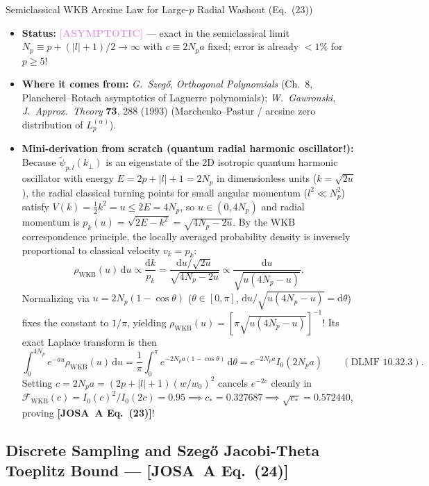 \documentclass[10pt,letterpaper]{article}
\newcommand{\abs}[1]{\lvert #1 \rvert}
\newcommand{\dd}{\mathrm{d}}
\newcommand{\josa}[1]{\textbf{[JOSA~A Eq.~(#1)]}}
\newcommand{\tagasymp}{\textcolor{plum}{\textbf{[ASYMPTOTIC]}}}
\numberwithin{equation}{section}
\begin{document}
\begin{approxbox}{Semiclassical WKB Arcsine Law for Large-$p$ Radial Washout (Eq.~(23))}
\begin{itemize}[leftmargin=1.4em,itemsep=2pt,topsep=1pt]
  \item \textbf{Status:} \tagasymp{} --- exact in the semiclassical limit $N_p \equiv p + (\abs{l}+1)/2 \to \infty$ with $c \equiv 2N_p a$ fixed; error is already $< 1\%$ for $p \ge 5$!
  \item \textbf{Where it comes from:} \emph{G.\ Szeg\H{o}}, \emph{Orthogonal Polynomials} (Ch.~8, Plancherel--Rotach asymptotics of Laguerre polynomials); \emph{W.\ Gawronski}, \emph{J.\ Approx.\ Theory} \textbf{73}, 288 (1993) (Marchenko--Pastur / arcsine zero distribution of $L_p^{(\alpha)}$).
  \item \textbf{Mini-derivation from scratch (quantum radial harmonic oscillator!):} Because $\widetilde{\psi}_{p,l}(k_\perp)$ is an eigenstate of the 2D isotropic quantum harmonic oscillator with energy $E = 2p + \abs{l} + 1 = 2N_p$ in dimensionless units ($k = \sqrt{2u}$), the radial classical turning points for small angular momentum ($l^2 \ll N_p^2$) satisfy $V(k) = \frac{1}{2}k^2 = u \le 2E = 4N_p$, so $u \in (0, 4N_p)$ and radial momentum is $p_k(u) = \sqrt{2E - k^2} = \sqrt{4N_p - 2u}$. By the WKB correspondence principle, the locally averaged probability density is inversely proportional to classical velocity $v_k = p_k$:
  \[
    \rho_{\mathrm{WKB}}(u)\,\dd u \propto \frac{\dd k}{p_k} = \frac{\dd u/\sqrt{2u}}{\sqrt{4N_p - 2u}} \propto \frac{\dd u}{\sqrt{u(4N_p - u)}}.
  \]
  Normalizing via $u = 2N_p(1 - \cos\theta)$ ($\theta \in [0,\pi]$, $\dd u/\sqrt{u(4N_p-u)} = \dd\theta$) fixes the constant to $1/\pi$, yielding $\rho_{\mathrm{WKB}}(u) = [\pi\sqrt{u(4N_p-u)}]^{-1}$! Its exact Laplace transform is then
  \[
    \int_0^{4N_p} e^{-au}\rho_{\mathrm{WKB}}(u)\,\dd u = \frac{1}{\pi}\int_0^\pi e^{-2N_p a(1-\cos\theta)}\,\dd\theta = e^{-2N_p a} I_0(2N_p a) \qquad (\text{DLMF~10.32.3}).
  \]
  Setting $c = 2N_p a = (2p+\abs{l}+1)(w/w_0)^2$ cancels $e^{-2c}$ cleanly in $\mathcal{F}_{\mathrm{WKB}}(c) = I_0(c)^2/I_0(2c) = 0.95 \implies c_* = 0.327687 \implies \sqrt{c_*} = \mathbf{0.572440}$, proving \josa{23}!
\end{itemize}
\end{approxbox}

\subsection{Discrete Sampling and Szeg\H{o} Jacobi-Theta Toeplitz Bound --- \josa{24}}
\end{document}
